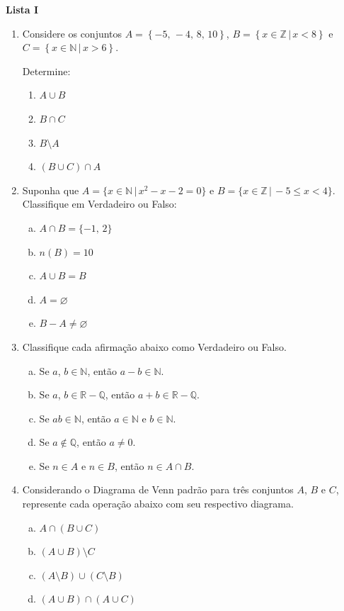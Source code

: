 \documentclass[12pt,a4paper]{article}
\begin{document}
\begin{center}
  \textbf{Lista I}
\end{center}

\begin{enumerate}
  \item Considere os conjuntos $A = \left\{-5,\,-4,\,8,\,10\right\}$,
    $B = \left\{x\in\mathbb{Z} \,|\, x < 8\right\}$ e
    $C = \left\{x\in\mathbb{N} \,|\, x > 6\right\}$.

    Determine:
    \begin{enumerate}
      \item $A\cup B$
      \item $B\cap C$
      \item $B\setminus A$
      \item $(B\cup C)\cap A$
    \end{enumerate}

  \item Suponha que $A = \{x\in\mathbb{N} \,|\, x^2 - x - 2 = 0\}$ e 
    $B = \{x\in\mathbb{Z} \,|\, -5 \leq x < 4 \}$. Classifique em Verdadeiro ou
    Falso:

    \begin{enumerate}[(a)(\ \ )]
      \item $A\cap B = \{-1,\,2\}$
      \item $n(B) = 10$
      \item $A\cup B = B$
      \item $A=\varnothing$
      \item $B - A \neq \varnothing$
    \end{enumerate}

  \item Classifique cada afirmação abaixo como Verdadeiro ou Falso.

    \begin{enumerate}[(a)(\ \ )]
      \item Se $a$, $b\in\mathbb{N}$, então $a - b \in\mathbb{N}$.
      \item Se $a$, $b\in\mathbb{R} - \mathbb{Q}$, então 
        $a + b \in\mathbb{R} - \mathbb{Q}$.
      \item Se $ab \in \mathbb{N}$, então $a \in \mathbb{N}$ e $b \in \mathbb{N}$.
      \item Se $a\notin \mathbb{Q}$, então $a\neq 0$.
      \item Se $n\in A$ e $n\in B$, então $n\in A\cap B$.
    \end{enumerate}

  \item Considerando o Diagrama de Venn padrão para três conjuntos $A$, $B$ e
  $C$, represente cada operação abaixo com seu respectivo diagrama.

    \begin{enumerate}[(a)]
      \item $A\cap(B\cup C)$
      \item $(A\cup B)\setminus C$
      \item $(A\setminus B)\cup(C\setminus B)$
      \item $(A\cup B)\cap(A\cup C)$
    \end{enumerate}

\end{enumerate}
\end{document}
